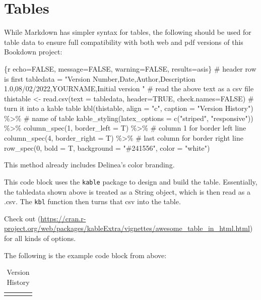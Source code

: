 \documentclass[
]{book}
\newenvironment{Shaded}{\begin{snugshade}}{\end{snugshade}}
\newcommand{\NormalTok}[1]{#1}
\begin{document}
\hypertarget{tables}{%
\section{Tables}\label{tables}}

While Markdown has simpler syntax for tables, the following should be used for table data to ensure full compatibility with both web and pdf versions of this Bookdown project:

\begin{Shaded}
\begin{Highlighting}[]
\NormalTok{\textasciigrave{}\textasciigrave{}\textasciigrave{}\{r echo=FALSE, message=FALSE, warning=FALSE, results=\textquotesingle{}asis\textquotesingle{}\}}
\NormalTok{\# header row is first}
\NormalTok{tabledata = "Version Number,Date,Author,Description}
\NormalTok{1.0,08/02/2022,YOURNAME,Initial version}
\NormalTok{"}
\NormalTok{\# read the above text as a csv file}
\NormalTok{thistable \textless{}{-} read.csv(text = tabledata, header=TRUE, check.names=FALSE)}
\NormalTok{\# turn it into a kable table}
\NormalTok{kbl(thistable, align = "c", caption = "Version History") \%\textgreater{}\% \# name of table}
\NormalTok{  kable\_styling(latex\_options = c("striped", "responsive")) \%\textgreater{}\%}
\NormalTok{  column\_spec(1, border\_left = T) \%\textgreater{}\% \# column 1 for border left line}
\NormalTok{  column\_spec(4, border\_right = T) \%\textgreater{}\% \# last column for border right line}
\NormalTok{  row\_spec(0, bold = T, background = "\#241556", color = "white")}
\NormalTok{\textasciigrave{}\textasciigrave{}\textasciigrave{}}
\end{Highlighting}
\end{Shaded}

This method already includes Delinea's color branding.

This code block uses the \texttt{kable} package to design and build the table. Essentially, the tabledata shown above is treated as a String object, which is then read as a .csv. The \texttt{kbl} function then turns that csv into the table.

Check out (\url{https://cran.r-project.org/web/packages/kableExtra/vignettes/awesome_table_in_html.html}) for all kinds of options.

The following is the example code block from above:\newline

\begin{table}

\caption{\label{tab:unnamed-chunk-5}Version History}
\centering
\begin{tabular}[t]{|>{}c|c|c|>{}c|}
\hline
\cellcolor[HTML]{241556}{\textcolor{white}{\textbf{Version Number}}} & \cellcolor[HTML]{241556}{\textcolor{white}{\textbf{Date}}} & \cellcolor[HTML]{241556}{\textcolor{white}{\textbf{Author}}} & \cellcolor[HTML]{241556}{\textcolor{white}{\textbf{Description}}}\\
\hline
\cellcolor{gray!6}{1} & \cellcolor{gray!6}{08/02/2022} & \cellcolor{gray!6}{YOURNAME} & \cellcolor{gray!6}{Initial version}\\
\hline
\end{tabular}
\end{table}
\end{document}

